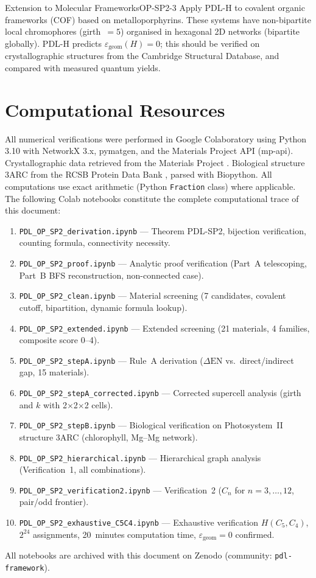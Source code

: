 \documentclass[12pt,a4paper]{article}
\newcommand{\epsgeom}{\varepsilon_{\mathrm{geom}}}
\newcommand{\DEN}{\Delta\mathrm{EN}}
\begin{document}
\begin{openproblem}{Extension to Molecular Frameworks}{OP-SP2-3}
Apply PDL-H to covalent organic frameworks (COF) based on metalloporphyrins.
These systems have non-bipartite local chromophores (girth~$= 5$)
organised in hexagonal 2D networks (bipartite globally). PDL-H predicts
$\epsgeom(H) = 0$; this should be verified on crystallographic structures
from the Cambridge Structural Database, and compared with measured
quantum yields.
\end{openproblem}

\section{Computational Resources}
\label{sec:computational}

All numerical verifications were performed in Google Colaboratory
using Python 3.10 with NetworkX 3.x, pymatgen, and the Materials
Project API (mp-api). Crystallographic data retrieved from the
Materials Project \cite{Jain2013}. Biological structure 3ARC from
the RCSB Protein Data Bank \cite{Umena2011}, parsed with Biopython.
All computations use exact arithmetic (Python \texttt{Fraction} class)
where applicable. The following Colab notebooks constitute the
complete computational trace of this document:

\begin{enumerate}[label=\textbf{NB\arabic*.}]
  \item \texttt{PDL\_OP\_SP2\_derivation.ipynb} — Theorem PDL-SP2,
    bijection verification, counting formula, connectivity necessity.
  \item \texttt{PDL\_OP\_SP2\_proof.ipynb} — Analytic proof verification
    (Part~A telescoping, Part~B BFS reconstruction, non-connected case).
  \item \texttt{PDL\_OP\_SP2\_clean.ipynb} — Material screening (7
    candidates, covalent cutoff, bipartition, dynamic formula lookup).
  \item \texttt{PDL\_OP\_SP2\_extended.ipynb} — Extended screening
    (21 materials, 4 families, composite score 0--4).
  \item \texttt{PDL\_OP\_SP2\_stepA.ipynb} — Rule~A derivation
    ($\DEN$ vs.\ direct/indirect gap, 15 materials).
  \item \texttt{PDL\_OP\_SP2\_stepA\_corrected.ipynb} — Corrected
    supercell analysis (girth and $k$ with 2$\times$2$\times$2 cells).
  \item \texttt{PDL\_OP\_SP2\_stepB.ipynb} — Biological verification
    on Photosystem~II structure 3ARC (chlorophyll, Mg--Mg network).
  \item \texttt{PDL\_OP\_SP2\_hierarchical.ipynb} — Hierarchical graph
    analysis (Verification~1, all combinations).
  \item \texttt{PDL\_OP\_SP2\_verification2.ipynb} — Verification~2
    ($C_n$ for $n=3,\ldots,12$, pair/odd frontier).
  \item \texttt{PDL\_OP\_SP2\_exhaustive\_C5C4.ipynb} — Exhaustive
    verification $H(C_5, C_4)$, $2^{24}$ assignments, 20~minutes
    computation time, $\epsgeom = 0$ confirmed.
\end{enumerate}

All notebooks are archived with this document on Zenodo
(community: \texttt{pdl-framework}).
 


\end{document}
